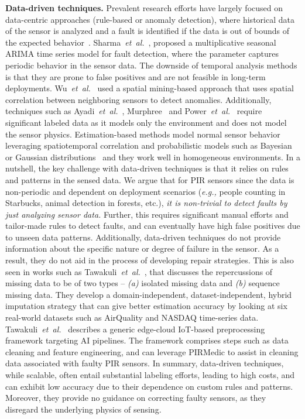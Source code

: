 \documentclass[manuscript]{acmart}
\newcommand{\eg}{{\it e.g.,}\xspace}
\newcommand{\etal}{{\it et~al.}\xspace}
\newcommand{\ca}{{\it (a) }}
\newcommand{\cb}{{\it (b) }}
\newcommand{\sol}{{PIRMedic}\xspace}
\begin{document}
\textbf{Data-driven techniques.} Prevalent research efforts have largely focused on data-centric approaches (rule-based or anomaly detection), where historical data of the sensor is analyzed and a fault is identified if the data is out of bounds of the expected behavior~\cite{rashid2016collect, 10.1145/3365871.3365872}.  Sharma~\etal~\cite{10.1145/1754414.1754419}, proposed a multiplicative seasonal ARIMA time series model for fault detection, where the parameter captures periodic behavior in the sensor data. The downside of temporal analysis methods is that
they are prone to false positives and are not feasible in long-term
deployments. Wu~\etal~\cite{4262542} used a spatial mining-based approach that uses spatial correlation between neighboring sensors to detect anomalies. Additionally, techniques such as Ayadi~\etal~\cite{7505190}, Murphree~\cite{7589589} and Power~\etal~\cite{10.1145/3365871.3365872} require significant labeled data as it models only the environment and does not model the sensor physics. Estimation-based methods model normal sensor behavior leveraging spatiotemporal correlation and probabilistic models such as Bayesian or Gaussian distributions~\cite{10.1145/1140104.1140114} and they work well in homogeneous environments. In a nutshell, the key challenge with data-driven techniques is that it relies on rules and patterns in the sensed data.
We argue that for PIR sensors since the data is non-periodic and dependent on deployment scenarios (\eg people counting in Starbucks,   
animal detection in forests, etc.), \textit{it is non-trivial to detect faults by just analyzing sensor data.} Further, this requires significant manual efforts and tailor-made rules to detect faults, and can eventually have high false positives due to unseen data patterns. Additionally, data-driven techniques do not provide information about the specific nature or degree of failure in the sensor. As a result, they do not aid in the process of developing repair strategies. This is also seen in works such as Tawakuli~\etal~\cite{tawakuli2023experience}, that discusses the repercussions of missing data to be of two types -- \ca isolated missing data and \cb sequence missing data. They develop a domain-independent, dataset-independent, hybrid imputation strategy that can give better estimation accuracy by looking at six real-world datasets such as AirQuality and NASDAQ time-series data. Tawakuli~\etal~\cite{Tawakuli2022TransformingID} describes a generic edge-cloud IoT-based preprocessing framework targeting AI pipelines. The framework comprises steps such as data cleaning and feature engineering, and can leverage \sol to assist in cleaning data associated with faulty PIR sensors. In summary, data-driven techniques, while scalable, often entail substantial labeling efforts, leading to high costs, and can exhibit low accuracy due to their dependence on custom rules and patterns. Moreover, they provide no guidance on correcting faulty sensors, as they disregard the underlying physics of sensing.
\end{document}
